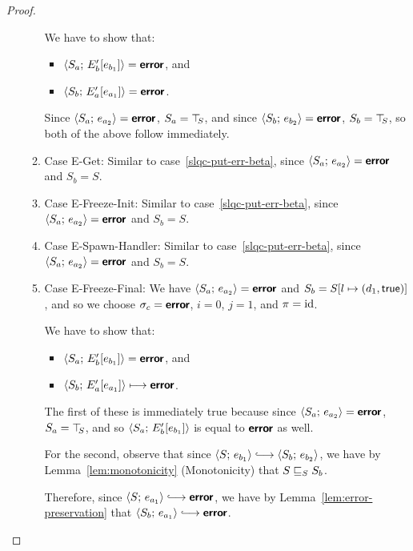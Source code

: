 \begin{proof}
\begin{enumerate}
\begin{enumerate}
      We have to show that:
      \begin{itemize}
      \item $\langle S_a;\, E'_b\hspace{-0.5mm}\left[e_{b_1}\right] \rangle = \textbf{\textsf{error}}$, and
      \item $\langle S_b;\, E'_a\hspace{-0.5mm}\left[e_{a_1}\right] \rangle = \textbf{\textsf{error}}$.
      \end{itemize}

      Since $\langle S_a;\, e_{a_2} \rangle = \textbf{\textsf{error}}$, $S_a = \top\hspace{-0.85mm}_{S}$, and since
      $\langle S_b;\, e_{b_2} \rangle = \textbf{\textsf{error}}$, $S_b = \top\hspace{-0.85mm}_{S}$, so both of the
      above follow immediately.

    \item \label{slqc-put-err-get}Case {\sc E-Get}: Similar to
      case~\ref{slqc-put-err-beta}, since $\langle S_a;\, e_{a_2} \rangle =
      \textbf{\textsf{error}}$ and $S_b = S$.
    \item \label{slqc-put-err-freeze-init}Case {\sc E-Freeze-Init}:
      Similar to case~\ref{slqc-put-err-beta}, since
      $\langle S_a;\, e_{a_2} \rangle = \textbf{\textsf{error}}$ and $S_b = S$.
    \item \label{slqc-put-err-spawn-handler}Case {\sc
      E-Spawn-Handler}: Similar to case~\ref{slqc-put-err-beta}, since
      $\langle S_a;\, e_{a_2} \rangle = \textbf{\textsf{error}}$ and $S_b = S$.
    \item \label{slqc-put-err-freeze-final}Case {\sc E-Freeze-Final}:
      We have $\langle S_a;\, e_{a_2} \rangle = \textbf{\textsf{error}}$ and $S_b =
      S[l \mapsto (d_1, \textsf{true})]$, and so we choose $\sigma_c =
      \textbf{\textsf{error}}$, $i = 0$, $j = 1$, and $\pi = \mathrm{id}$.

      We have to show that:
      \begin{itemize}
      \item $\langle S_a;\, E'_b\hspace{-0.5mm}\left[e_{b_1}\right] \rangle = \textbf{\textsf{error}}$,
        and
      \item $\langle S_b;\, E'_a\hspace{-0.5mm}\left[e_{a_1}\right] \rangle \longmapsto
        \textbf{\textsf{error}}$.
      \end{itemize}

      The first of these is immediately true because since
      $\langle S_a;\, e_{a_2} \rangle = \textbf{\textsf{error}}$, $S_a = \top\hspace{-0.85mm}_{S}$, and so
      $\langle S_a;\, E'_b\hspace{-0.5mm}\left[e_{b_1}\right] \rangle$ is equal to $\textbf{\textsf{error}}$ as
      well.

      For the second, observe that since $\config{S}{e_{b_1}}
      \parstepsto \config{S_b}{e_{b_2}}$, we have by
      Lemma~\ref{lem:monotonicity} (Monotonicity) that
      $S \sqsubseteq_S S_b$.

      Therefore, since $\config{S}{e_{a_1}} \parstepsto \error$, we
      have by Lemma~\ref{lem:error-preservation} that
      $\config{S_b}{e_{a_1}} \parstepsto \error$.


\end{enumerate}
\end{enumerate}
\end{proof}
